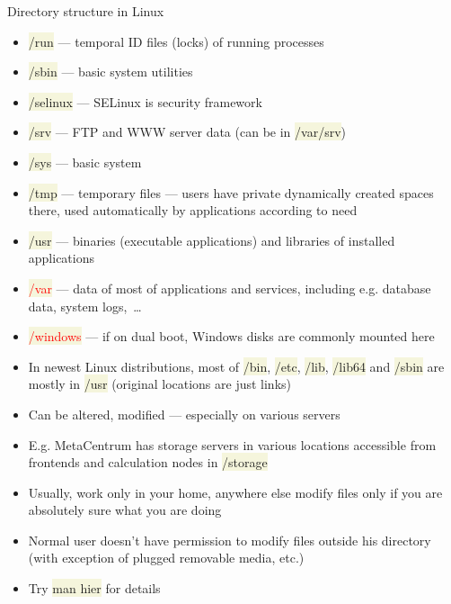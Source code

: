 \documentclass[compress, xelatex, 11pt, xcolor=svgnames, aspectratio=169,
	hyperref={
		bookmarks=true,
		unicode=true,
		colorlinks=true,
		pdftitle={Linux, command line and MetaCentrum},
		plainpages=false,
		pdfauthor={Vojtech Zeisek},
		pdfsubject={Course about use of Linux command line, writing shell scripts and using MetaCentrum of CESNET},
		pdfcreator={XeLaTeX},
		pdfkeywords={Linux, GNU, BASH, shell, command line, MetaCentrum},
		linkcolor=DarkRed, %
		anchorcolor=DarkBlue, %
		citecolor=Indigo, %
		filecolor=NavyBlue, %
		menucolor=DarkMagenta, %
		urlcolor=DarkBlue, %
		},
	url={hyphens, lowtilde} %
	]{beamer}
\renewcommand{\texttt}[1]{\colorbox{Beige}{{\ttfamily #1}}}
\renewcommand{\alert}[1]{\textcolor{red}{#1}}
\begin{document}
\begin{frame}[allowframebreaks]{Directory structure in Linux}
\begin{itemize}
		\item \texttt{/run} --- temporal ID files (locks) of running processes
		\item \texttt{/sbin} --- basic system utilities
		\item \texttt{/selinux} --- SELinux is security framework
		\item \texttt{/srv} --- FTP and WWW server data (can be in \texttt{/var/srv})
		\item \texttt{/sys} --- basic system
		\item \texttt{/tmp} --- temporary files --- users have private dynamically created spaces there, used automatically by applications according to need
		\item \texttt{/usr} --- binaries (executable applications) and libraries of installed applications
		\item \alert{\texttt{/var}} --- data of most of applications and services, including e.g. database data, system logs,~\ldots
		\item \alert{\texttt{/windows}} --- if on dual boot, Windows disks are commonly mounted here
		\item In newest Linux distributions, most of \texttt{/bin}, \texttt{/etc}, \texttt{/lib}, \texttt{/lib64} and \texttt{/sbin} are mostly in \texttt{/usr} (original locations are just links)
		\item Can be altered, modified --- especially on various servers
		\item E.g. MetaCentrum has storage servers in various locations accessible from frontends and calculation nodes in \texttt{/storage}
		\item Usually, work only in your home, anywhere else modify files only if you are absolutely sure what you are doing
		\item Normal user doesn't have permission to modify files outside his directory (with exception of plugged removable media, etc.)
		\item Try \texttt{man hier} for details
	\end{itemize}
\end{frame}
\end{document}
